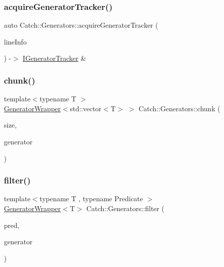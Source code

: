 \subsubsection{\texorpdfstring{acquireGeneratorTracker()}{acquireGeneratorTracker()}}
{\footnotesize\ttfamily auto Catch\+::\+Generators\+::acquire\+Generator\+Tracker (\begin{DoxyParamCaption}\item[{\mbox{\hyperlink{struct_catch_1_1_source_line_info}{Source\+Line\+Info}} const \&}]{line\+Info }\end{DoxyParamCaption}) -\/$>$  \mbox{\hyperlink{struct_catch_1_1_i_generator_tracker}{I\+Generator\+Tracker}} \&}

\mbox{\label{namespace_catch_1_1_generators_a0ac5eeee0354973c318f62d0937a7981}} 
\subsubsection{\texorpdfstring{chunk()}{chunk()}}
{\footnotesize\ttfamily template$<$typename T $>$ \\
\mbox{\hyperlink{class_catch_1_1_generators_1_1_generator_wrapper}{Generator\+Wrapper}}$<$std\+::vector$<$T$>$ $>$ Catch\+::\+Generators\+::chunk (\begin{DoxyParamCaption}\item[{size\+\_\+t}]{size,  }\item[{\mbox{\hyperlink{class_catch_1_1_generators_1_1_generator_wrapper}{Generator\+Wrapper}}$<$ T $>$ \&\&}]{generator }\end{DoxyParamCaption})}

\mbox{\label{namespace_catch_1_1_generators_afd87f4cbf259f2252aee164d6905b18b}} 
\subsubsection{\texorpdfstring{filter()}{filter()}}
{\footnotesize\ttfamily template$<$typename T , typename Predicate $>$ \\
\mbox{\hyperlink{class_catch_1_1_generators_1_1_generator_wrapper}{Generator\+Wrapper}}$<$T$>$ Catch\+::\+Generators\+::filter (\begin{DoxyParamCaption}\item[{Predicate \&\&}]{pred,  }\item[{\mbox{\hyperlink{class_catch_1_1_generators_1_1_generator_wrapper}{Generator\+Wrapper}}$<$ T $>$ \&\&}]{generator }\end{DoxyParamCaption})}

